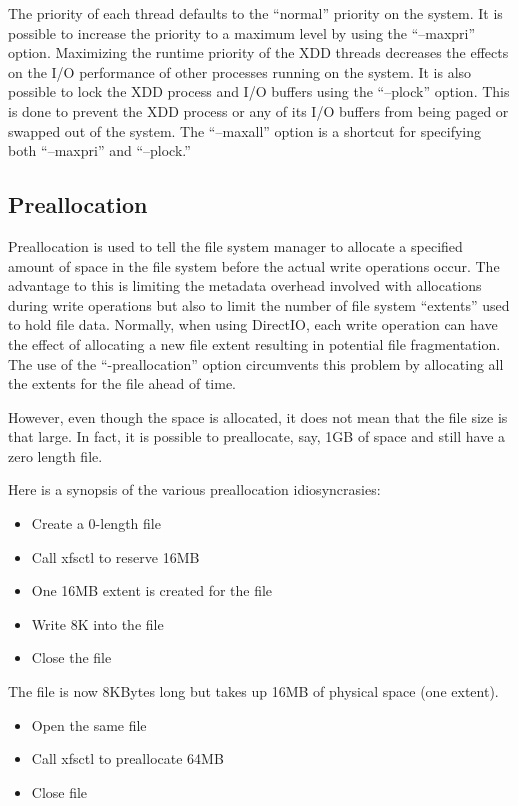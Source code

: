 The priority of each thread defaults to the ``normal'' priority on the system. It is possible to increase the priority to a maximum level by using the ``--maxpri'' option. Maximizing the runtime priority of the XDD threads decreases the effects on the I/O performance of other processes running on the system. It is also possible to lock the XDD process and I/O buffers using the ``--plock'' option. This is done to prevent the XDD process or any of its I/O buffers from being paged or swapped out of the system. The ``--maxall'' option is a shortcut for specifying both ``--maxpri'' and ``--plock.''

\subsection{Preallocation}\label{preallocation}

Preallocation is used to tell the file system manager to allocate a specified amount of space in the file system before the actual write operations occur. The advantage to this is limiting the metadata overhead involved with allocations during write operations but also to limit the number of file system ``extents'' used to hold file data. Normally, when using DirectIO, each write operation can have the effect of allocating a new file extent resulting in potential file fragmentation. The use of the ``-preallocation'' option circumvents this problem by allocating all the extents for the file ahead of time.

However, even though the space is allocated, it does not mean that the file size is that large. In fact, it is possible to preallocate, say, 1GB of space and still have a zero length file.

Here is a synopsis of the various preallocation idiosyncrasies:

\begin{itemize}
\item
  Create a 0-length file
\item
  Call xfsctl to reserve 16MB~
\item
  One 16MB extent is created for the file
\item
  Write 8K into the file~
\item
  Close the file
\end{itemize}

The file is now 8KBytes long but takes up 16MB of physical space (one extent).

\begin{itemize}
\item
  Open the same file
\item
  Call xfsctl to preallocate 64MB~
\item
  Close file
\end{itemize}

